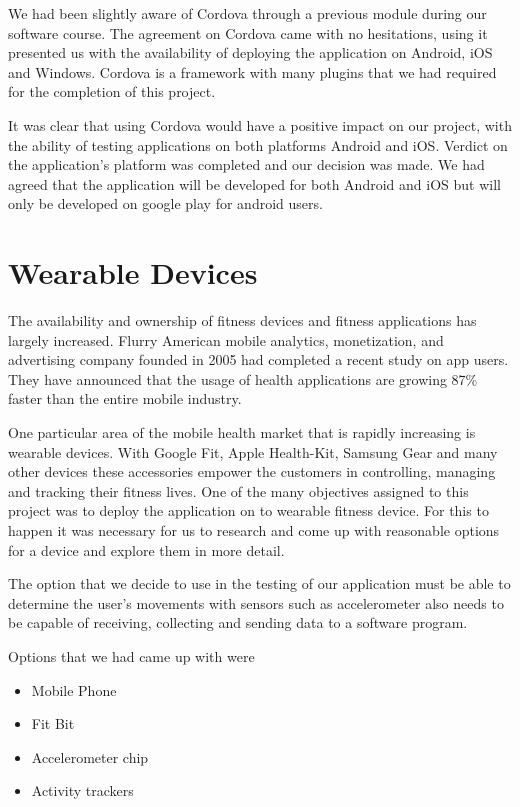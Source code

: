 \documentclass[a4paper,12pt]{report}
\begin{document}
We had been slightly aware of Cordova through a previous module during our software course.
The agreement on Cordova came with no hesitations, using it presented us with the availability of deploying the application on Android, iOS and Windows. 
Cordova is a framework with many plugins that we had required for the completion of this project. 

It was clear that using Cordova would have a positive impact on our project, with the ability of testing applications on both platforms Android and iOS. \cite{cordova} Verdict on the application's platform was completed and our decision was made. We had agreed that the application will be developed for both Android and iOS but will only be developed on google play for android users.  

\section{Wearable Devices}
The availability and ownership of fitness devices and fitness applications has largely increased. Flurry American mobile analytics, monetization, and advertising company founded in 2005 had completed a recent study on app users.
They have announced that the usage of health applications are growing 87\% faster than the entire mobile industry.

One particular area of the mobile health market that is rapidly increasing is wearable devices. With Google Fit, Apple Health-Kit, Samsung Gear and many other devices these accessories empower the customers in controlling, managing and tracking their fitness lives.\cite{rhodes2014accessing}
One of the many objectives assigned to this project was to deploy the application on to wearable fitness device.
For this to happen it was necessary for us to research and come up with reasonable options for a device and explore them in more detail.

The option that we decide to use in the testing of our application must be able to determine the user's movements with sensors such as accelerometer also needs to be capable of receiving, collecting and sending data to a software program.

Options that we had came up with were 
\begin{itemize}
    \item Mobile Phone 
    \item Fit Bit
    \item Accelerometer chip
    \item Activity trackers
\end{itemize}
\end{document}
